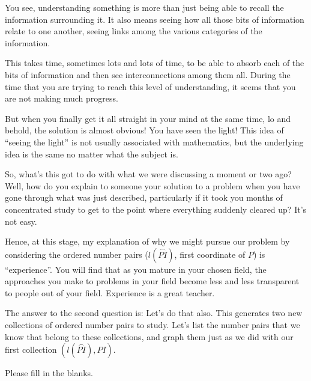 \documentclass[english]{book}
\newcommand{\arc}[1]{\overset{\frown}{#1} }
\begin{document}
\vfill

You see, understanding something is more than just being able to recall the information surrounding it. It also means seeing how all those bits of information relate to one another, seeing links among the various categories of the information. 

\vfill

This takes time, sometimes lots and lots of time, to be able to absorb each of the bits of information and then see interconnections among them all. During the time that you are trying to reach this level of understanding, it seems that you are not making much progress. 

\vfill

But when you finally get it all straight in your mind at the same time, lo and behold, the solution is almost obvious! You have seen the light! This idea of ``seeing the light'' is not usually associated with mathematics, but the underlying idea is the same no matter what the subject is.

\vfill

So, what's this got to do with what we were discussing a moment or two ago? Well, how do you explain to someone your solution to a problem when you have gone through what was just described, particularly if it took you months of concentrated study to get to the point where everything suddenly cleared up? It's not easy. 

\vfill

Hence, at this stage, my explanation of why we might pursue our problem by considering the ordered number pairs ($l(\arc{PI})$, first coordinate of $P$) is ``experience''. You will find that as you mature in your chosen field, the approaches you make to problems in your field become less and less transparent to people out of your field. Experience is a great teacher.

\vfill

The answer to the second question is: Let's do that also. This generates two new collections of ordered number pairs to study. Let's list the number pairs that we know that belong to these collections, and graph them just as we did with our first collection $(l(\arc{PI}), PI)$.

\vspace{3.5cm}

Please fill in the blanks.
\end{document}
